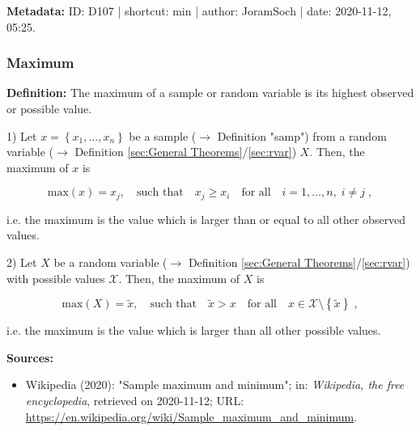 \documentclass[a4paper,12pt,twoside]{book}
\begin{document}
\vspace{1em}
\textbf{Metadata:} ID: D107 | shortcut: min | author: JoramSoch | date: 2020-11-12, 05:25.
\vspace{1em}



\subsubsection[\textit{Maximum}]{Maximum} \label{sec:max}
\setcounter{equation}{0}

\textbf{Definition:} The maximum of a sample or random variable is its highest observed or possible value.

\vspace{1em}
1) Let $x = \left\lbrace x_1, \ldots, x_n \right\rbrace$ be a sample ($\rightarrow$ Definition "samp") from a random variable ($\rightarrow$ Definition \ref{sec:General Theorems}/\ref{sec:rvar}) $X$. Then, the maximum of $x$ is

\begin{equation} \label{eq:max-max-samp}
\mathrm{max}(x) = x_j, \quad \text{such that} \quad x_j \geq x_i \quad \text{for all} \quad i = 1, \ldots, n, \; i \neq j \; ,
\end{equation}

i.e. the maximum is the value which is larger than or equal to all other observed values.

\vspace{1em}
2) Let $X$ be a random variable ($\rightarrow$ Definition \ref{sec:General Theorems}/\ref{sec:rvar}) with possible values $\mathcal{X}$. Then, the maximum of $X$ is

\begin{equation} \label{eq:max-max-rvar}
\mathrm{max}(X) = \tilde{x}, \quad \text{such that} \quad \tilde{x} > x \quad \text{for all} \quad x \in \mathcal{X}\setminus\left\lbrace \tilde{x} \right\rbrace \; ,
\end{equation}

i.e. the maximum is the value which is larger than all other possible values.


\vspace{1em}
\textbf{Sources:}
\begin{itemize}
\item Wikipedia (2020): "Sample maximum and minimum"; in: \textit{Wikipedia, the free encyclopedia}, retrieved on 2020-11-12; URL: \url{https://en.wikipedia.org/wiki/Sample_maximum_and_minimum}.
\end{itemize}
\end{document}
